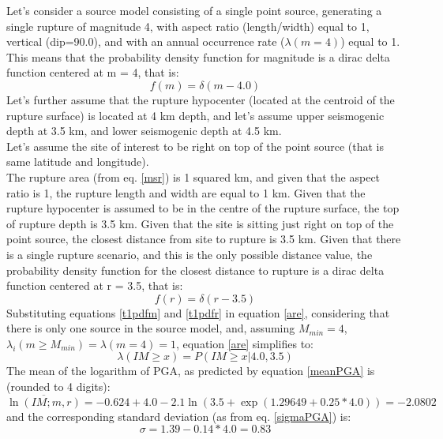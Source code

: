 Let's consider a source model consisting of a single point source, generating 
a single rupture of magnitude 4, with aspect ratio (length/width) equal to 1, 
vertical (dip=90.0), and with an annual occurrence rate ($\lambda(m=4)$) 
equal to 1. 
%
This means that the probability density function for magnitude is a dirac delta
function centered at m = 4, that is: \begin{equation} \label{t1pdfm} f(m) =
\delta(m - 4.0) \end{equation} Let's further assume that the rupture hypocenter
(located at the centroid of the rupture surface) is located at 4 km depth, and
let's assume upper seismogenic depth at 3.5 km, and lower seismogenic depth at
4.5 km.\\ Let's assume the site of interest to be right on top of the point
source (that is same latitude and longitude).\\ The rupture area (from eq.
\ref{msr}) is 1 squared km, and given that the aspect ratio is 1, the rupture
length and width are equal to 1 km. Given that the rupture hypocenter is assumed
to be in the centre of the rupture surface, the top of rupture depth is 3.5 km.
Given that the site is sitting just right on top of the point source, the
closest distance from site to rupture is 3.5 km.  Given that there is a single
rupture scenario, and this is the only possible distance value, the probability
density function for the closest distance to rupture is a dirac delta function
centered at r = 3.5, that is:
\begin{equation}
\label{t1pdfr}
f(r) = \delta(r - 3.5)
\end{equation}
Substituting equations \ref{t1pdfm} and \ref{t1pdfr} in equation \ref{are},
considering that there is only one source in the source model, and, assuming
$M_{min}=4$,  $\lambda_{i}(m\geq M_{min}) = \lambda(m=4) = 1$, equation
\ref{are} simplifies to:
\begin{equation}
\lambda(IM \geq x) = P(IM\geq x | 4.0, 3.5)
\end{equation}
The mean of the logarithm of PGA, as predicted by equation \ref{meanPGA} is
(rounded to 4 digits):
\begin{equation}
\overline{\ln(IM;m,r)} = -0.624 + 4.0 - 2.1\ln(3.5 + \exp(1.29649 + 0.25 * 4.0)) = -2.0802
\end{equation}
and the corresponding standard deviation (as from eq. \ref{sigmaPGA}) is:
\begin{equation}
\sigma = 1.39 - 0.14 * 4.0  = 0.83
\end{equation}

